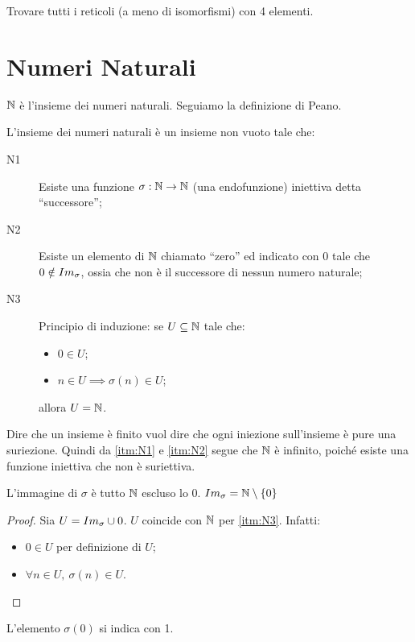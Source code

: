 \begin{esercizio}
Trovare tutti i reticoli (a meno di isomorfismi) con 4 elementi.
\end{esercizio}

\section{Numeri Naturali}

$\mathbb{N}$ \`e l'insieme dei numeri naturali. Seguiamo la definizione di Peano.
\begin{defn}
L'insieme dei numeri naturali \`e un insieme non vuoto tale che:
\begin{description}
  \item[N1\label{itm:N1}] Esiste una funzione $\sigma : \mathbb{N} \to \mathbb{N}$ (una endofunzione) iniettiva detta ``successore'';
  \item[N2\label{itm:N2}] Esiste un elemento di $\mathbb{N}$ chiamato ``zero'' ed indicato con 0 tale che $0 \notin Im_{\sigma}$, ossia che non \`e il successore di nessun numero naturale;
  \item[N3\label{itm:N3}] Principio di induzione: se $U \subseteq \mathbb{N}$ tale che:
  \begin{itemize}
    \item $0 \in U$;
    \item $n \in U \implies \sigma(n) \in U$;
  \end{itemize}
  allora $U = \mathbb{N}$.
\end{description}
\end{defn}
Dire che un insieme \`e finito vuol dire che ogni iniezione sull'insieme \`e pure una suriezione. Quindi da \ref{itm:N1} e \ref{itm:N2} segue che $\mathbb{N}$ \`e infinito, poich\'e esiste una funzione iniettiva che non \`e suriettiva.
\begin{prop}
L'immagine di $\sigma$ \`e tutto $\mathbb{N}$ escluso lo 0. $Im_{\sigma} = \mathbb{N} \setminus \{ 0 \}$
\end{prop}
\begin{proof}
Sia $U = Im_{\sigma} \cup 0$. $U$ coincide con $\mathbb{N}$ per \ref{itm:N3}. Infatti:
\begin{itemize}
  \item $0 \in U$ per definizione di $U$;
  \item $\forall n \in U, \ \sigma(n) \in U$.
\end{itemize}
\end{proof}
L'elemento $\sigma(0)$ si indica con 1.

